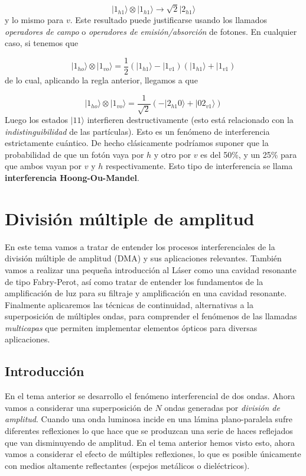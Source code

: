 \documentclass[12pt,a4paper]{book}
\numberwithin{equation}{section}
\numberwithin{figure}{section}
\newcommand{\parentesis}[1]{\left( #1  \right)}
\newcommand{\1}{_{(1)}}
\newcommand{\2}{_{(2)}}
\theoremstyle{definition}
\begin{document}
\begin{equation}
|1_{h1} \rangle \otimes |1_{h1} \rangle \rightarrow \sqrt{2} |2_{h1} \rangle
\end{equation}
y lo mismo para $v$. Este resultado puede justificarse usando los llamados \textit{operadores de campo} o \textit{operadores de emisión/absorción} de fotones. En cualquier caso, si tenemos que

$$|1_{ho}\rangle \otimes |1_{vo} \rangle = \frac{1}{2} \parentesis{|1_{h1}\rangle - |1_{v1}}\parentesis{|1_{h1}\rangle + |1_{v1}}$$
de lo cual, aplicando la regla anterior, llegamos a que

\begin{equation}
|1_{ho}\rangle \otimes |1_{vo}\rangle   = \frac{1}{\sqrt{2}} \parentesis{ -|2_{h1}0\rangle + |02_{v1}\rangle  }
\end{equation}
Luego los estados $|11\rangle$ interfieren destructivamente (esto está relacionado con la \textit{indistinguibilidad} de las partículas). Esto es un fenómeno de interferencia estrictamente cuántico. De hecho clásicamente podríamos suponer que la probabilidad de que un fotón vaya por $h$ y otro por $v$ es del 50\%, y un 25\% para que ambos vayan por $v$ y $h$ respectivamente. Esto tipo de interferencia se llama \textbf{interferencia Hoong-Ou-Mandel}. 

\newpage

\chapter{División múltiple de amplitud}

En este tema vamos a tratar de entender los procesos interferenciales de la división múltiple de amplitud (DMA) y sus aplicaciones relevantes. También vamos a realizar una pequeña introducción al Láser como una cavidad resonante de tipo Fabry-Perot, así como tratar de entender los fundamentos de la amplificación de luz para su filtraje y amplificación en una cavidad resonante. Finalmente aplicaremos las técnicas de continuidad, alternativas a la superposición de múltiples ondas, para comprender el fenómenos de las llamadas  \textit{multicapas} que permiten implementar elementos ópticos para diversas aplicaciones. 

\section{Introducción}

En el tema anterior se desarrollo el fenómeno interferencial de dos ondas. Ahora vamos a considerar una superposición de $N$ ondas generadas por \textit{división de amplitud}. Cuando una onda luminosa incide en una lámina plano-paralela sufre diferentes reflexiones lo que hace que se produzcan una serie de haces reflejados que van disminuyendo de amplitud. En el tema anterior hemos visto esto, ahora vamos a considerar el efecto de múltiples reflexiones, lo que es posible únicamente con medios altamente reflectantes (espejos metálicos o dieléctricos). \\
\end{document}
